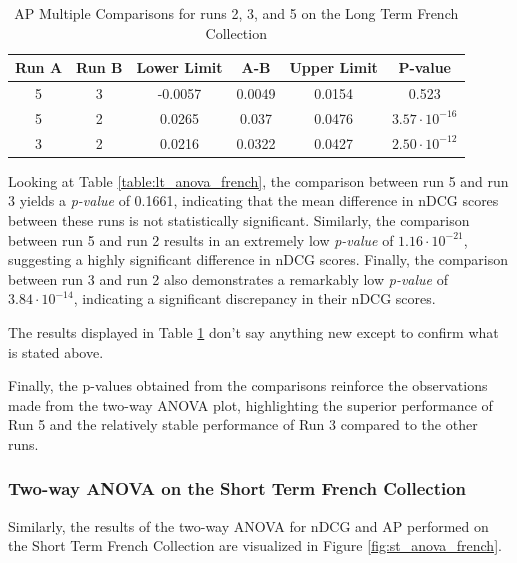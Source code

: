 \begin{table}[!h]
    \centering
    \caption{\ac{AP} Multiple Comparisons for runs 2, 3, and 5 on the Long Term French Collection}
    \label{table:lt_anova_french_ap}
    \begin{tabular}{cccccc}
    \hline
    Run A & Run B & Lower Limit & A-B & Upper Limit & P-value \\ \hline
    5 & 3 & -0.0057 & 0.0049 & 0.0154 & 0.523 \\
    5 & 2 & 0.0265 & 0.037 & 0.0476 & $3.57 \cdot 10^{-16}$ \\
    3 & 2 & 0.0216 & 0.0322 & 0.0427 & $2.50 \cdot 10^{-12}$ \\ \hline
    \end{tabular}
\end{table}

Looking at Table \ref{table:lt_anova_french}, the comparison between run 5 and run 3 yields a \textit{p-value} of 0.1661, indicating that the mean difference in \ac{nDCG} scores between these runs is not statistically significant.
Similarly, the comparison between run 5 and run 2 results in an extremely low \textit{p-value} of $1.16 \cdot 10^{-21}$, suggesting a highly significant difference in \ac{nDCG} scores.
Finally, the comparison between run 3 and run 2 also demonstrates a remarkably low \textit{p-value} of $3.84 \cdot 10^{-14}$, indicating a significant discrepancy in their \ac{nDCG} scores.

The results displayed in Table \ref{table:lt_anova_french_ap} don't say anything new except to confirm what is stated above.

Finally, the p-values obtained from the comparisons reinforce the observations made from the two-way \ac{ANOVA} plot, highlighting the superior performance of Run 5 and the relatively stable performance of Run 3 compared to the other runs.


\subsubsection{Two-way ANOVA on the Short Term French Collection}

Similarly, the results of the two-way \ac{ANOVA} for \ac{nDCG} and \ac{AP} performed on the Short Term French Collection are visualized in Figure \ref{fig:st_anova_french}.

